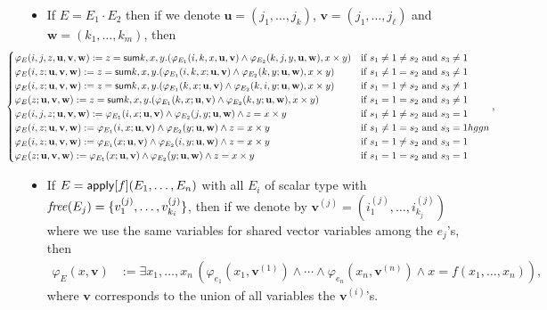 \begin{itemize}
\item If $E = E_1 \cdot E_2$   then 
if we denote $\mathbf{u}=(j_1,\ldots,j_k)$,
$\mathbf{v}=(j_1,\ldots,j_\ell)$ and 
$\mathbf{w}=(k_1,\ldots,k_m)$, then
\[\hspace{-1.5cm}\begin{cases}
\varphi_E(i,j,z,\mathbf{u},\mathbf{v},\mathbf{w}):=z = \Sum k,x,y . (\varphi_{E_1}(i,k,x,\mathbf{u},\mathbf{v}) \land \varphi_{E_2}(k,j,y,\mathbf{u},\mathbf{w}), x \times y)
 & \text{if } s_1 \neq 1 \neq s_2 \text{ and } s_3 \neq 1
\cr
\varphi_E(i,z;\mathbf{u},\mathbf{v},\mathbf{w}):=z = \Sum k,x,y . (\varphi_{E_1}(i,k,x;\mathbf{u},\mathbf{v}) \land \varphi_{E_2}(k,y;\mathbf{u},\mathbf{w}), x \times y)
& \text{if } s_1 \neq 1 = s_2 \text{ and } s_3 \neq 1
\cr
\varphi_E(i,z;\mathbf{u},\mathbf{v},\mathbf{w}):=z = \Sum k,x,y . (\varphi_{E_1}(k,x;\mathbf{u},\mathbf{v}) \land \varphi_{E_2}(k,i,y;\mathbf{u},\mathbf{w}), x \times y)
  & \text{if } s_1 = 1 \neq s_2 \text{ and } s_3 \neq 1
\cr
\varphi_E(z;\mathbf{u},\mathbf{v},\mathbf{w}):=z = \Sum k,x,y . (\varphi_{E_1}(k,x;\mathbf{u},\mathbf{v}) \land \varphi_{E_2}(k,y;\mathbf{u},\mathbf{w}), x \times y)
 & \text{if } s_1 = 1 = s_2 \text{ and } s_3 \neq 1
\cr
\varphi_E(i,j,z;\mathbf{u},\mathbf{v},\mathbf{w}):=\varphi_{E_1}(i,x;\mathbf{u},\mathbf{v}) \land \varphi_{E_2}(j,y;\mathbf{u},\mathbf{w}) \land z=x \times y
 & \text{if } s_1 \neq 1 \neq s_2 \text{ and } s_3 = 1
\cr
\varphi_E(i,z;\mathbf{u},\mathbf{v},\mathbf{w}):=\varphi_{E_1}(i,x;\mathbf{u},\mathbf{v}) \land \varphi_{E_2}(y;\mathbf{u},\mathbf{w}) \land z=x \times y
 & \text{if } s_1 \neq 1 = s_2 \text{ and } s_3 = 1hgg n  
\cr
\varphi_E(i,z;\mathbf{u},\mathbf{v},\mathbf{w}):=\varphi_{E_1}(x;\mathbf{u},\mathbf{v}) \land \varphi_{E_2}(i,y;\mathbf{u},\mathbf{w})\land z=x \times y
 & \text{if } s_1 = 1 \neq s_2 \text{ and } s_3 = 1
\cr
\varphi_E(z;\mathbf{u},\mathbf{v},\mathbf{w}):=\varphi_{E_1}(x;\mathbf{u},\mathbf{v}) \land \varphi_{E_2}(y;\mathbf{u},\mathbf{w}) \land z=x \times y
 & \text{if } s_1 = 1 = s_2 \text{ and } s_3 = 1
\cr
\end{cases},
\]


\item If $E = \mathsf{apply}[f](E_1,\ldots,E_n)$ with all $E_i$ of scalar type with $\operatorname{\mathit{free}}(E_j)=\{v_1^{(j)},\ldots,v_{k_i}^{(j)}\}$, then if we denote by
$\mathbf{v}^{(j)}=(i_1^{(j)},\ldots,i_{k_j}^{(j)})$ where we use the same variables for shared vector variables among the $e_j$'s, then
\begin{align*}
\varphi_E(x,\mathbf{v})&:=\exists x_1,\ldots,x_n\, (\varphi_{e_1}(x_1,\mathbf{v}^{(1)})\land \cdots \land \varphi_{e_n}(x_n,\mathbf{v}^{(n)})\land x=f(x_1,\ldots,x_n)),
\end{align*}
where $\mathbf{v}$ corresponds to the union of all variables the $\mathbf{v}^{(i)}$'s.


\end{itemize}
